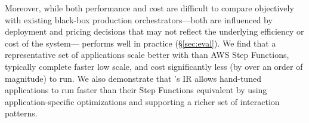 Moreover, while both performance and cost are difficult to compare objectively
with existing black-box production orchestrators---both are influenced by
deployment and pricing decisions that may not reflect the underlying efficiency
or cost of the system---\name{} performs well in practice (\S\ref{sec:eval}). We
find that a representative set of applications scale better with \name{} than
AWS Step Functions, typically complete faster low scale, and cost
significantly less (by over an order of magnitude) to run. We also demonstrate
that \name{}'s IR allows hand-tuned applications to run faster than their Step
Functions equivalent by using application-specific optimizations and supporting
a richer set of interaction patterns.
